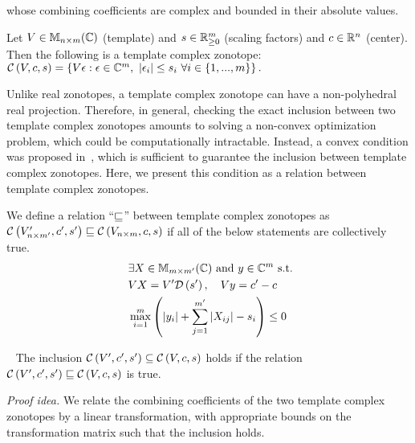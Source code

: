 whose combining coefficients are complex and bounded in their absolute
values.
%
\begin{definition}
Let $V\in\mat{n}{m}{\mb{C}}$ (template) and $s\in\mb{R}^m_{\geq 0}$ (scaling factors) and
$c\in\realset^n$ (center).  Then the following is a template complex zonotope:
$\cz{V}{c}{s} =
\lt\{V\epsilon:\epsilon\in\mb{C}^m,~\lt|\epsilon_i\rt|\leq s_i~\forall
i\in\tup{m}\rt\}.$
\end{definition}
%
Unlike real zonotopes, a template complex zonotope can have a
non-polyhedral real projection.  Therefore, in general, checking the
exact inclusion between two template complex zonotopes amounts to
solving a non-convex optimization problem, which could be
computationally intractable.  Instead, a convex condition was proposed
in~\cite{tcz2017}, which is sufficient to guarantee the inclusion
between template complex zonotopes.  Here, we present this condition
as a relation between template complex zonotopes.  
%
\begin{definition}
We define a relation ``$\order$'' between template complex zonotopes
as\\ $\cz{V^\pr_{n\times m^\pr}}{c^\pr}{s^\pr}\order \cz{V_{n\times
    m}}{c}{s}$ if all of the below statements are collectively true.
\begin{align}~\label{eqn:tcz-inc}
\begin{split}
& \exists X\in\mat{m}{m^\pr}{\mb{C}}~\text{and}~y\in\mb{C}^{m}~\text{s.t.}\\
& \transfer{V}{V^\pr}{s^\pr}{X},~~~\centertransfer{V}{c}{c^\pr}{y}\\
& \scalebound{X}{y}{s}{m}{m^\pr}\leq 0\\
\end{split}
\end{align}
\end{definition}
%
\begin{lemma}~\label{lem:zon-zon} The
inclusion $\cz{V^\pr}{c^\pr}{s^\pr}\subseteq \cz{V}{c}{s}$ holds if
the relation $\cz{{V^\pr}}{c^\pr}{s^\pr}\order \cz{V}{c}{s}$ is true.
\end{lemma}
\emph{Proof idea.}
We relate the combining
coefficients of the two template complex zonotopes by a linear
transformation, with appropriate bounds on the transformation matrix
such that the inclusion holds.

